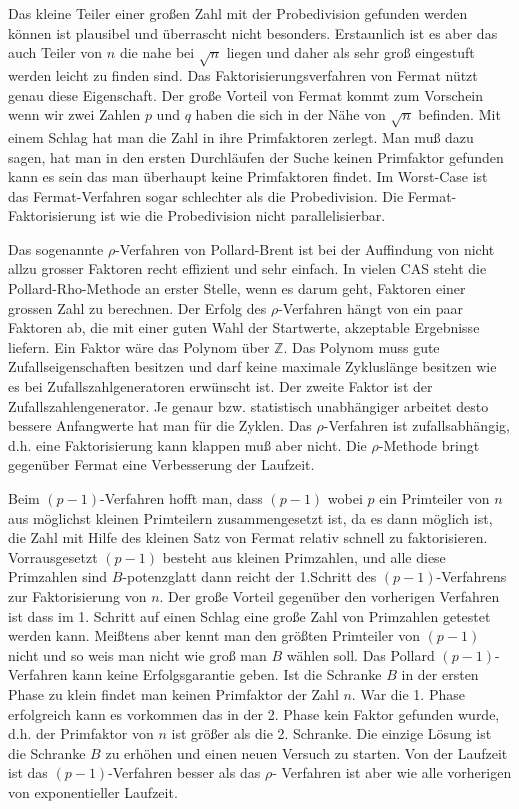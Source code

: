 \documentclass[10pt, bigheadings]{scrartcl}
\begin{document}
Das kleine Teiler einer großen Zahl mit der Probedivision gefunden werden können
ist plausibel und überrascht nicht besonders. Erstaunlich ist es aber das auch
Teiler von $n$ die nahe bei $\sqrt{n}$ liegen und daher als sehr groß eingestuft
werden leicht zu finden sind. Das Faktorisierungsverfahren von Fermat nützt
genau diese Eigenschaft. Der große Vorteil von Fermat kommt zum Vorschein 
wenn wir zwei Zahlen $p$ und $q$ haben die sich in der Nähe von $\sqrt{n}$ 
befinden. Mit einem Schlag hat man die Zahl in ihre Primfaktoren zerlegt. Man 
muß dazu sagen, hat man in den ersten Durchläufen der Suche keinen Primfaktor
gefunden kann es sein das man überhaupt keine Primfaktoren findet. Im Worst-Case
ist das Fermat-Verfahren sogar schlechter als die Probedivision. Die 
Fermat-Faktorisierung ist wie die Probedivision nicht parallelisierbar.

Das sogenannte $\rho$-Verfahren von Pollard-Brent ist bei der Auffindung
von nicht allzu grosser Faktoren recht effizient und sehr einfach. In
vielen CAS steht die Pollard-Rho-Methode an erster Stelle, wenn es darum
geht, Faktoren einer grossen Zahl zu berechnen. Der Erfolg des $\rho$-Verfahren
hängt von ein paar Faktoren ab, die mit einer guten Wahl der Startwerte, 
akzeptable Ergebnisse liefern. Ein Faktor wäre das Polynom über $\mathbb Z$. 
Das Polynom muss gute Zufallseigenschaften besitzen und darf keine maximale
Zykluslänge besitzen wie es bei Zufallszahlgeneratoren erwünscht ist. Der zweite
Faktor ist der Zufallszahlengenerator. Je genaur bzw. statistisch unabhängiger
arbeitet desto bessere Anfangwerte hat man für die Zyklen. Das $\rho$-Verfahren
ist zufallsabhängig, d.h. eine Faktorisierung kann klappen muß aber nicht. Die  
$\rho$-Methode bringt gegenüber Fermat eine Verbesserung der Laufzeit.

Beim $(p-1)$-Verfahren hofft man, dass $(p-1)$ wobei $p$ ein Primteiler von $n$
aus möglichst kleinen Primteilern zusammengesetzt ist, da es dann möglich ist, die
Zahl mit Hilfe des kleinen Satz von Fermat relativ schnell zu faktorisieren.
Vorrausgesetzt $(p-1)$ besteht aus kleinen Primzahlen, und alle diese Primzahlen
sind $B$-potenzglatt dann reicht der 1.Schritt des $(p-1)$-Verfahrens zur
Faktorisierung von $n$. Der große Vorteil gegenüber den vorherigen Verfahren ist
dass im 1. Schritt auf einen Schlag eine große Zahl von Primzahlen getestet 
werden kann. Meißtens aber kennt man den größten Primteiler von $(p-1)$ nicht 
und so weis man nicht wie groß man $B$ wählen soll. 
Das Pollard $(p-1)$-Verfahren kann keine Erfolgsgarantie geben. Ist die Schranke
$B$
in der ersten Phase zu klein findet man keinen Primfaktor der Zahl $n$. War die
1. Phase erfolgreich kann es vorkommen das in der 2. Phase kein Faktor gefunden
wurde, d.h. der Primfaktor von $n$ ist größer als die 2. Schranke. Die einzige 
Lösung ist die Schranke $B$ zu erhöhen und einen neuen Versuch zu
starten. Von der Laufzeit ist das $(p-1)$-Verfahren besser als das $\rho$-
Verfahren ist aber wie alle vorherigen von exponentieller Laufzeit.
\end{document}
